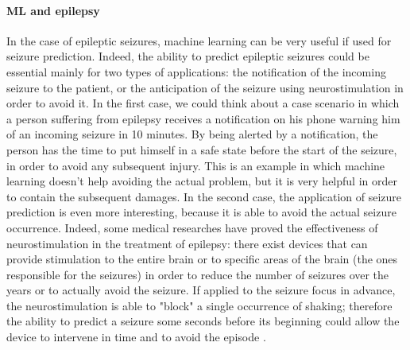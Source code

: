 \paragraph{ML and epilepsy} In the case of epileptic seizures, machine learning can be very useful if used for seizure prediction. Indeed, the ability to predict epileptic seizures could be essential mainly for two types of applications: the notification of the incoming seizure to the patient, or the anticipation of the seizure using neurostimulation in order to avoid it. In the first case, we could think about a case scenario in which a person suffering from epilepsy receives a notification on his phone warning him of an incoming seizure in 10 minutes. By being alerted by a notification, the person has the time to put himself in a safe state before the start of the seizure, in order to avoid any subsequent injury. This is an example in which machine learning doesn't help avoiding the actual problem, but it is very helpful in order to contain the subsequent damages. In the second case, the application of seizure prediction is even more interesting, because it is able to avoid the actual seizure occurrence. Indeed, some medical researches \cite{NCBI:Neurostimulation} have proved the effectiveness of neurostimulation in the treatment of epilepsy: there exist devices that can provide stimulation to the entire brain or to specific areas of the brain (the ones responsible for the seizures) in order to reduce the number of seizures over the years or to actually avoid the seizure. If applied to the seizure focus in advance, the neurostimulation is able to "block" a single occurrence of shaking; therefore the ability to predict a seizure some seconds before its beginning could allow the device to intervene in time and to avoid the episode \cite{EF:Neurostimulation}.

